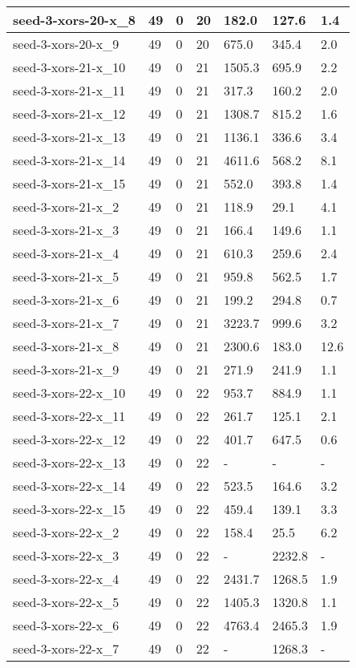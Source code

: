\begin{scriptsize}
\begin{longtable}{|p{5cm}|l|l|l|l|l|l|}
seed-3-xors-20-x\_8&49&0&20&182.0&127.6&1.4 \\ \hline 
seed-3-xors-20-x\_9&49&0&20&675.0&345.4&2.0 \\ \hline 
seed-3-xors-21-x\_10&49&0&21&1505.3&695.9&2.2 \\ \hline 
seed-3-xors-21-x\_11&49&0&21&317.3&160.2&2.0 \\ \hline 
seed-3-xors-21-x\_12&49&0&21&1308.7&815.2&1.6 \\ \hline 
seed-3-xors-21-x\_13&49&0&21&1136.1&336.6&3.4 \\ \hline 
seed-3-xors-21-x\_14&49&0&21&4611.6&568.2&8.1 \\ \hline 
seed-3-xors-21-x\_15&49&0&21&552.0&393.8&1.4 \\ \hline 
seed-3-xors-21-x\_2&49&0&21&118.9&29.1&4.1 \\ \hline 
seed-3-xors-21-x\_3&49&0&21&166.4&149.6&1.1 \\ \hline 
seed-3-xors-21-x\_4&49&0&21&610.3&259.6&2.4 \\ \hline 
seed-3-xors-21-x\_5&49&0&21&959.8&562.5&1.7 \\ \hline 
seed-3-xors-21-x\_6&49&0&21&199.2&294.8&0.7 \\ \hline 
seed-3-xors-21-x\_7&49&0&21&3223.7&999.6&3.2 \\ \hline 
seed-3-xors-21-x\_8&49&0&21&2300.6&183.0&12.6 \\ \hline 
seed-3-xors-21-x\_9&49&0&21&271.9&241.9&1.1 \\ \hline 
seed-3-xors-22-x\_10&49&0&22&953.7&884.9&1.1 \\ \hline 
seed-3-xors-22-x\_11&49&0&22&261.7&125.1&2.1 \\ \hline 
seed-3-xors-22-x\_12&49&0&22&401.7&647.5&0.6 \\ \hline 
seed-3-xors-22-x\_13&49&0&22&-&-&- \\ \hline 
seed-3-xors-22-x\_14&49&0&22&523.5&164.6&3.2 \\ \hline 
seed-3-xors-22-x\_15&49&0&22&459.4&139.1&3.3 \\ \hline 
seed-3-xors-22-x\_2&49&0&22&158.4&25.5&6.2 \\ \hline 
seed-3-xors-22-x\_3&49&0&22&-&2232.8&- \\ \hline 
seed-3-xors-22-x\_4&49&0&22&2431.7&1268.5&1.9 \\ \hline 
seed-3-xors-22-x\_5&49&0&22&1405.3&1320.8&1.1 \\ \hline 
seed-3-xors-22-x\_6&49&0&22&4763.4&2465.3&1.9 \\ \hline 
seed-3-xors-22-x\_7&49&0&22&-&1268.3&- \\ \hline 

\end{longtable}
\end{scriptsize}
